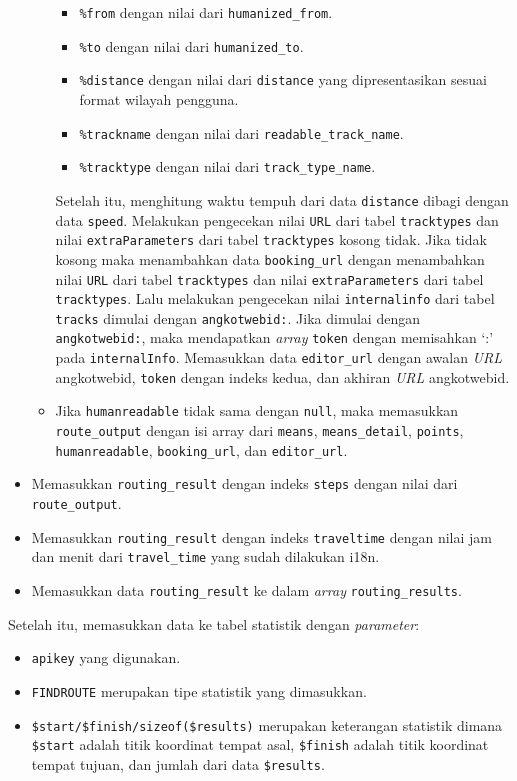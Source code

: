 \begin{itemize}
\begin{itemize}
		  \begin{itemize}
		  		\item \verb!%from! dengan nilai dari \verb!humanized_from!.
		  		\item \verb!%to! dengan nilai dari \verb!humanized_to!.
		  		\item \verb!%distance! dengan nilai dari \verb!distance! yang dipresentasikan sesuai format wilayah pengguna.
		  		\item \verb!%trackname! dengan nilai dari \verb!readable_track_name!.
		  		\item \verb!%tracktype! dengan nilai dari \verb!track_type_name!.		  		
		  \end{itemize}
		 Setelah itu, menghitung waktu tempuh dari data \verb!distance! dibagi dengan data \verb!speed!. Melakukan pengecekan nilai \verb!URL! dari tabel \verb!tracktypes! dan nilai  \verb!extraParameters! dari tabel \verb!tracktypes! kosong tidak. Jika tidak kosong maka menambahkan data \verb!booking_url! dengan menambahkan nilai \verb!URL! dari tabel \verb!tracktypes! dan nilai  \verb!extraParameters! dari tabel \verb!tracktypes!. 
		 Lalu melakukan pengecekan nilai \verb!internalinfo! dari tabel \verb!tracks! dimulai dengan \verb!angkotwebid:!. Jika dimulai dengan \verb!angkotwebid:!, maka mendapatkan \textit{array} \verb!token! dengan memisahkan `:' pada \verb!internalInfo!. Memasukkan data  \verb!editor_url! dengan awalan \textit{URL} angkotwebid, \verb!token! dengan indeks kedua, dan akhiran \textit{URL} angkotwebid. 
		 \item Jika \verb!humanreadable! tidak sama dengan \verb!null!, maka memasukkan \verb!route_output! dengan isi array dari \verb!means!, \verb!means_detail!, \verb!points!,  \verb!humanreadable!, \verb!booking_url!, dan \verb!editor_url!. 
	\end{itemize}
	\item Memasukkan \verb!routing_result! dengan indeks \verb!steps! dengan nilai dari  \verb!route_output!.
	\item Memasukkan \verb!routing_result! dengan indeks \verb!traveltime! dengan nilai jam dan menit dari \verb!travel_time! yang sudah dilakukan i18n.
	\item Memasukkan data \verb!routing_result! ke dalam \textit{array} \verb!routing_results!.
\end{itemize}
Setelah itu, memasukkan data ke tabel statistik dengan \textit{parameter}:
	\begin{itemize}
		\item \verb!apikey! yang digunakan.
		\item \verb!FINDROUTE! merupakan tipe statistik yang dimasukkan.
		\item \verb!$start/$finish/sizeof($results)! merupakan keterangan statistik dimana \verb!$start! adalah titik koordinat tempat asal, \verb!$finish! adalah titik koordinat tempat tujuan, dan jumlah dari data \verb!$results!.
	\end{itemize}
